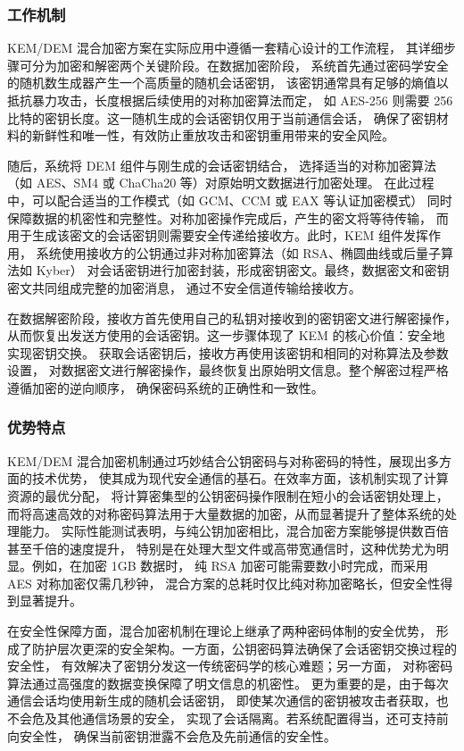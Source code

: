 \subsubsection{工作机制}
KEM/DEM 混合加密方案在实际应用中遵循一套精心设计的工作流程，
其详细步骤可分为加密和解密两个关键阶段。在数据加密阶段，
系统首先通过密码学安全的随机数生成器产生一个高质量的随机会话密钥，
该密钥通常具有足够的熵值以抵抗暴力攻击，长度根据后续使用的对称加密算法而定，
如 AES-256 则需要 256 比特的密钥长度。这一随机生成的会话密钥仅用于当前通信会话，
确保了密钥材料的新鲜性和唯一性，有效防止重放攻击和密钥重用带来的安全风险。

随后，系统将 DEM 组件与刚生成的会话密钥结合，
选择适当的对称加密算法（如 AES、SM4 或 ChaCha20 等）对原始明文数据进行加密处理。
在此过程中，可以配合适当的工作模式（如 GCM、CCM 或 EAX 等认证加密模式）
同时保障数据的机密性和完整性。对称加密操作完成后，产生的密文将等待传输，
而用于生成该密文的会话密钥则需要安全传递给接收方。此时，KEM 组件发挥作用，
系统使用接收方的公钥通过非对称加密算法（如 RSA、椭圆曲线或后量子算法如 Kyber）
对会话密钥进行加密封装，形成密钥密文。最终，数据密文和密钥密文共同组成完整的加密消息，
通过不安全信道传输给接收方。

在数据解密阶段，接收方首先使用自己的私钥对接收到的密钥密文进行解密操作，
从而恢复出发送方使用的会话密钥。这一步骤体现了 KEM 的核心价值：安全地实现密钥交换。
获取会话密钥后，接收方再使用该密钥和相同的对称算法及参数设置，
对数据密文进行解密操作，最终恢复出原始明文信息。整个解密过程严格遵循加密的逆向顺序，
确保密码系统的正确性和一致性。

\subsubsection{优势特点}
KEM/DEM 混合加密机制通过巧妙结合公钥密码与对称密码的特性，展现出多方面的技术优势，
使其成为现代安全通信的基石。在效率方面，该机制实现了计算资源的最优分配，
将计算密集型的公钥密码操作限制在短小的会话密钥处理上，
而将高速高效的对称密码算法用于大量数据的加密，从而显著提升了整体系统的处理能力。
实际性能测试表明，与纯公钥加密相比，混合加密方案能够提供数百倍甚至千倍的速度提升，
特别是在处理大型文件或高带宽通信时，这种优势尤为明显。例如，在加密 1GB 数据时，
纯 RSA 加密可能需要数小时完成，而采用 AES 对称加密仅需几秒钟，
混合方案的总耗时仅比纯对称加密略长，但安全性得到显著提升。

在安全性保障方面，混合加密机制在理论上继承了两种密码体制的安全优势，
形成了防护层次更深的安全架构。一方面，公钥密码算法确保了会话密钥交换过程的安全性，
有效解决了密钥分发这一传统密码学的核心难题；另一方面，
对称密码算法通过高强度的数据变换保障了明文信息的机密性。
更为重要的是，由于每次通信会话均使用新生成的随机会话密钥，
即使某次通信的密钥被攻击者获取，也不会危及其他通信场景的安全，
实现了会话隔离。若系统配置得当，还可支持前向安全性，
确保当前密钥泄露不会危及先前通信的安全性。

